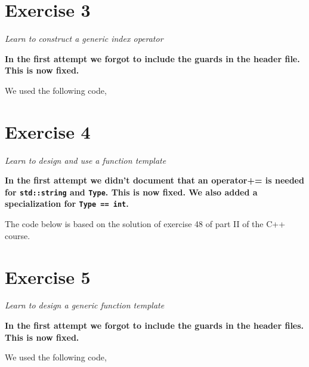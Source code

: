 \documentclass[12pt]{article}
\newcommand{\desc}[1]{\textit{#1} \vspace{1em}}
\begin{document}
\clearpage


\section*{Exercise 3}
\desc{Learn to construct a generic index operator}

\textbf{In the first attempt we forgot to include the guards in the header file. This is now fixed.}

We used the following code,



\clearpage


\section*{Exercise 4}
\desc{Learn to design and use a function template}

\textbf{In the first attempt we didn't document that an operator+= is needed for \texttt{std::string} and \texttt{Type}. This is now fixed. We also added a specialization for \texttt{Type == int}.}

The code below is based on the solution of exercise 48 of part II of the C++ course.




\clearpage

\section*{Exercise 5}
\desc{Learn to design a generic function template}

\textbf{In the first attempt we forgot to include the guards in the header files. This is now fixed.}

We used the following code,





\clearpage

\clearpage
\end{document}
